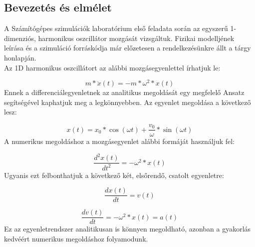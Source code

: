 \begin{multicols}{2}
\section{Bevezetés és elmélet} \label{sec:1}
A Számítógépes szimulációk laboratórium első feladata során az egyszerű 1-dimenziós, harmonikus oszcillátor mozgását vizsgáltuk. Fizikai modelljének leírása és a szimuláció forráskódja már előzetesen a rendelkezésünkre állt a tárgy honlapján\cite{szamszin}. \\
Az 1D harmonikus oszcillátort az alábbi mozgásegyenlettel írhatjuk le:

\begin{equation} \label{eq:1.1}
    m * \ddot{x} \left( t \right)  = - m * \omega^{2} * x \left( t \right)
\end{equation}
Ennek a differenciálegyenletnek az analitikus megoldását egy megfelelő Ansatz segítségével kaphatjuk meg a legkönnyebben. Az egyenlet megoldása a következő lesz:

\begin{equation} \label{eq:1.2}
    x \left( t \right)  = x_{0} * \cos(\omega t) + \frac{v_{0}}{\omega} * \sin(\omega t)
\end{equation}
A numerikus megoldáshoz a mozgásegyenlet alábbi formáját használjuk fel:

\begin{equation} \label{eq:1.3}
    \frac{d^{2} x \left( t \right) }{d t^{2}} = - \omega^{2} * x \left( t \right) 
\end{equation}
Ugyanis ezt felbonthatjuk a következő két, elsőrendő, csatolt egyenletre:

\begin{equation} \label{eq:1.4}
    \frac{dx \left( t \right)}{dt} = v \left( t \right) 
\end{equation}

\begin{equation} \label{eq:1.5}
    \frac{dv \left( t \right)}{dt} = - \omega^{2} * x \left( t \right) = a \left( t \right)
\end{equation}
Ez az egyenletrendszer analitikusan is könnyen megoldható, azonban a gyakorlás kedvéért numerikus megoldáshoz folyamodunk.


\end{multicols}
